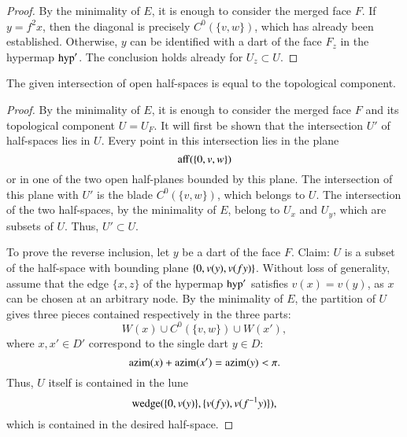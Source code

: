 \begin{proof}
By the minimality of $E$, it is enough to consider the merged face $F$.  
If $y=f^2x$, then the diagonal is precisely $C^0(\{v,w\})$,
which has already been established.  Otherwise, $y$ can be identified with
a dart of the face $F_z$ in the hypermap ${\operatorname{hyp}}'$.  The conclusion holds
already for $U_{z}\subset U$.  
\end{proof}


\begin{lemma} The given intersection of open half-spaces is equal
to the topological component. 
\end{lemma}

\begin{proof}
By the minimality of $E$, it is enough to consider
the merged face $F$ and its topological component $U=U_F$.
It will first be shown that the intersection $U'$ of half-spaces lies in $U$.
Every point in this intersection lies in the plane
$$
{\operatorname{aff}}(\{0,v,w\})
$$
or in one of the two open half-planes bounded by this plane.  The intersection
of this plane with $U'$ is the blade $C^0(\{v,w\})$, which belongs
to $U$. The intersection of the two half-spaces, by the minimality of $E$,
belong to $U_{x}$ and $U_{y}$, which are subsets of $U$.  Thus, $U'\subset U$.

To prove the reverse inclusion, let $y$  be a dart of
the face $F$.  Claim: $U$ is a subset of the half-space with bounding
plane $\{0,v(y),v(f y)\}$.  Without loss of generality, assume that the edge $\{x,z\}$ of the
hypermap ${\operatorname{hyp}}'$ satisfies $v(x) = v(y)$, as $x$ can be chosen at an
arbitrary node.  By the minimality of $E$,  
the partition  of $U$ gives three pieces
contained respectively in the three parts:
$$
W(x) \cup C^0(\{v,w\}) \cup W(x'),
$$
where $x,x'\in D'$ correspond to the single dart $y\in D$:
$$
{\operatorname{azim}}(x) + {\operatorname{azim}}(x') = {\operatorname{azim}}(y) < \pi.
$$
Thus, $U$ itself is contained in the lune
$$
{\operatorname{wedge}}(\{0,v(y)\},\{v(f y),v(f^{-1} y)\}),
$$
which is contained in the desired half-space.
\end{proof}

